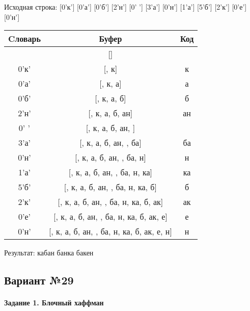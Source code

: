 \documentclass[a4paper, 12pt]{article}
\begin{document}
Исходная строка: [0'к'] [0'а'] [0'б'] [2'н'] [0' '] [3'а'] [0'н'] [1'а'] [5'б'] [2'к'] [0'е'] [0'н']\\
\begin{table}[h!]
\centering
\begin{tabular}{|c|c|c|}
\hline
 Cловарь & Буфер & Код  \\ \hline
 & [] & 
\\ \hline
0'к' & [, к] & к
\\ \hline
0'а' & [, к, а] & а
\\ \hline
0'б' & [, к, а, б] & б
\\ \hline
2'н' & [, к, а, б, ан] & ан
\\ \hline
0' ' & [, к, а, б, ан,  ] &  
\\ \hline
3'а' & [, к, а, б, ан,  , ба] & ба
\\ \hline
0'н' & [, к, а, б, ан,  , ба, н] & н
\\ \hline
1'а' & [, к, а, б, ан,  , ба, н, ка] & ка
\\ \hline
5'б' & [, к, а, б, ан,  , ба, н, ка,  б] &  б
\\ \hline
2'к' & [, к, а, б, ан,  , ба, н, ка,  б, ак] & ак
\\ \hline
0'е' & [, к, а, б, ан,  , ба, н, ка,  б, ак, е] & е
\\ \hline
0'н' & [, к, а, б, ан,  , ба, н, ка,  б, ак, е, н] & н
\\ \hline
\end{tabular}
\end{table}

Результат: кабан банка бакен
\pagebreak
\subsection{Вариант №29}
\paragraph{Задание 1. Блочный хаффман \\}
\end{document}
